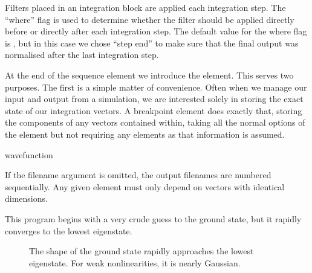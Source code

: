 \documentclass[letterpaper,10pt,english]{sphinxmanual}
\begin{document}
\sphinxAtStartPar
Filters placed in an integration block are applied each integration step.  The “where” flag is used to determine whether the filter should be applied directly before or directly after each integration step.  The default value for the where flag is , but in this case we chose “step end” to make sure that the final output was normalised after the last integration step.

\sphinxAtStartPar
At the end of the sequence element we introduce the  element.  This serves two purposes.  The first is a simple matter of convenience.  Often when we manage our input and output from a simulation, we are interested solely in storing the exact state of our integration vectors.  A breakpoint element does exactly that, storing the components of any vectors contained within, taking all the normal options of the  element but not requiring any  elements as that information is assumed.

\begin{sphinxVerbatim}[commandchars=\\\{\}]
 
   wavefunction
\end{sphinxVerbatim}

\sphinxAtStartPar
If the filename argument is omitted, the output filenames are numbered sequentially.  Any given  element must only depend on vectors with identical dimensions.

\sphinxAtStartPar
This program begins with a very crude guess to the ground state, but it rapidly converges to the lowest eigenstate.

\begin{figure}[htbp]
\centering
\capstart

\noindent{}
\caption{The shape of the ground state rapidly approaches the lowest eigenstate.  For weak nonlinearities, it is nearly Gaussian.}\label{\detokenize{worked_examples:id5}}\end{figure}
\end{document}

